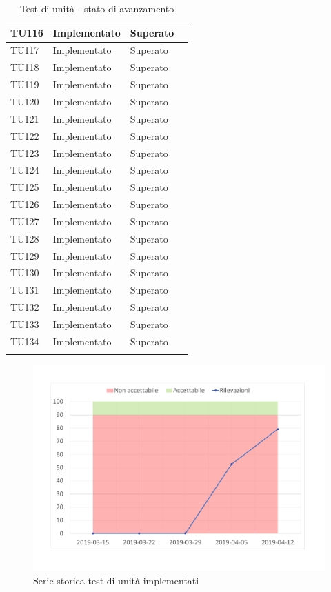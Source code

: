 \begin{longtable}{|>{\centering\arraybackslash}m{1.6cm}|>{\centering\arraybackslash}m{6.41cm}|>{\centering\arraybackslash}m{3.1cm}| c |}
	TU116 & Implementato & Superato  \\ \hline
	TU117 & Implementato & Superato  \\ \hline
	TU118 & Implementato & Superato  \\ \hline
	TU119 & Implementato & Superato  \\ \hline
	TU120 & Implementato & Superato  \\ \hline
	TU121 & Implementato & Superato  \\ \hline
	TU122 & Implementato & Superato  \\ \hline
	TU123 & Implementato & Superato  \\ \hline
	TU124 & Implementato & Superato  \\ \hline
	TU125 & Implementato & Superato  \\ \hline
	TU126 & Implementato & Superato  \\ \hline
	TU127 & Implementato & Superato  \\ \hline
	TU128 & Implementato & Superato  \\ \hline
	TU129 & Implementato & Superato  \\ \hline
	TU130 & Implementato & Superato  \\ \hline
	TU131 & Implementato & Superato  \\ \hline
	TU132 & Implementato & Superato  \\ \hline
	TU133 & Implementato & Superato  \\ \hline
	TU134 & Implementato & Superato  \\ \hline
	\caption{Test di unità - stato di avanzamento}
\end{longtable}

\begin{figure}[H]
	\centering
	\includegraphics[scale=0.6]{images/resoconto/MPC6Chart.pdf}
	\caption{Serie storica test di unità implementati}	
\end{figure}

